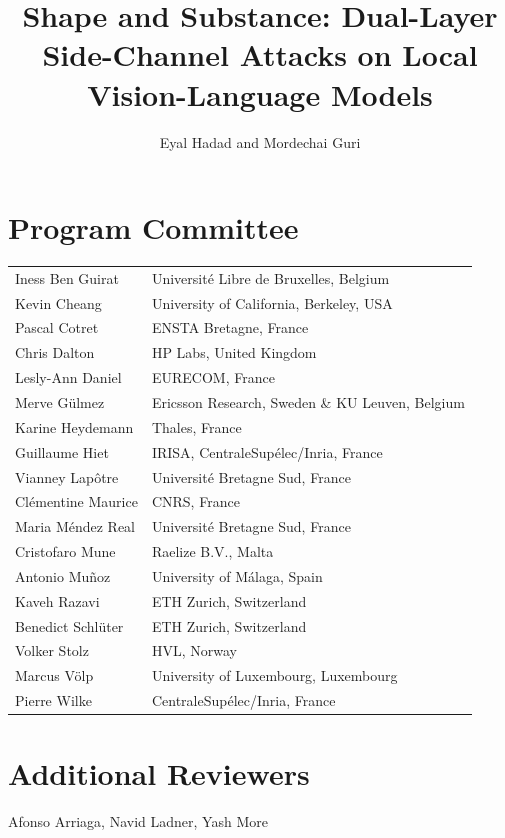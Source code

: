 \documentclass[runningheads]{llncs}
\begin{document}
\section*{Program Committee}
\begin{longtable}{p{}p{}}
Iness Ben Guirat     & Universit\'e Libre de Bruxelles, Belgium \\
Kevin Cheang         & University of California, Berkeley, USA  \\
Pascal Cotret        & ENSTA Bretagne, France \\
Chris Dalton         & HP Labs, United Kingdom \\
Lesly-Ann Daniel     & EURECOM, France \\
Merve G\"ulmez       & Ericsson Research, Sweden \& KU Leuven, Belgium \\
Karine Heydemann     & Thales, France \\
Guillaume Hiet       & IRISA, CentraleSup\'elec/Inria, France \\
Vianney Lap\^otre    & Universit\'e Bretagne Sud, France \\
Cl\'ementine Maurice & CNRS, France \\
Maria M\'endez Real  & Universit\'e Bretagne Sud, France \\
Cristofaro Mune      & Raelize B.V., Malta \\
Antonio Mu\~noz      & University of M\'alaga, Spain \\
Kaveh Razavi         & ETH Zurich, Switzerland \\
Benedict Schl\"uter  & ETH Zurich, Switzerland \\
Volker Stolz         & HVL, Norway \\
Marcus V\"olp        & University of  Luxembourg, Luxembourg \\
Pierre Wilke         & CentraleSup\'elec/Inria, France \\
\end{longtable}

\section*{Additional Reviewers}
\noindent Afonso Arriaga, Navid Ladner, Yash More \\

\tableofcontents

\mainmatter


\setcounter{page}{1}
\author{Eyal Hadad and Mordechai Guri}
\title{Shape and Substance: Dual-Layer Side-Channel Attacks on Local Vision-Language Models}
\maketitle
\clearpage
\end{document}

